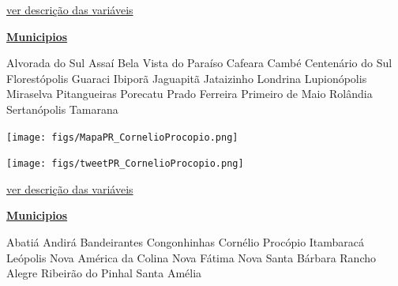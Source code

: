 \documentclass[10pt]{article} %
\begin{document}
\begin{minipage}[t]{.66\linewidth}
\begin{center}

\end{center}
\small{\hyperlink{vartab}{ver descrição das variáveis}}\end{minipage}\hfill\begin{minipage}[t]{.30\linewidth}
\begin{mdframed}[style=sidebar,frametitle={}]
\textbf{\hyperlink{municips}{Municipios}}\begin{itemize}\gsquare Alvorada do Sul 
\gsquare Assaí 
\gsquare Bela Vista do Paraíso 
\gsquare Cafeara 
\gsquare Cambé 
\gsquare Centenário do Sul 
\gsquare Florestópolis 
\gsquare Guaraci 
\gsquare Ibiporã 
\gsquare Jaguapitã 
\gsquare Jataizinho 
\gsquare Londrina 
\gsquare Lupionópolis 
\gsquare Miraselva 
\gsquare Pitangueiras 
\gsquare Porecatu 
\gsquare Prado Ferreira 
\gsquare Primeiro de Maio 
\gsquare Rolândia 
\gsquare Sertanópolis 
\gsquare Tamarana 
\end{itemize}\BackToContents\end{mdframed}\hfill\end{minipage}\newpage\begin{minipage}[t]{.66\linewidth}
\hypertarget{CrnP}{}
\texttt{[image: figs/MapaPR\_CornelioProcopio.png]}\vspace{0.5cm}\vspace{0.5cm}\begin{center}
\texttt{[image: figs/tweetPR\_CornelioProcopio.png]}\end{center}
\begin{center}

\end{center}
\small{\hyperlink{vartab}{ver descrição das variáveis}}\end{minipage}\hfill\begin{minipage}[t]{.30\linewidth}
\begin{mdframed}[style=sidebar,frametitle={}]
\textbf{\hyperlink{municips}{Municipios}}\begin{itemize}\gsquare Abatiá 
\gsquare Andirá 
\gsquare Bandeirantes 
\gsquare Congonhinhas 
\gsquare Cornélio Procópio 
\gsquare Itambaracá 
\gsquare Leópolis 
\gsquare Nova América da Colina 
\gsquare Nova Fátima 
\gsquare Nova Santa Bárbara 
\gsquare Rancho Alegre 
\gsquare Ribeirão do Pinhal 
\gsquare Santa Amélia 

\end{itemize}
\end{mdframed}
\end{minipage}
\end{document}
